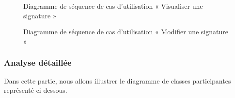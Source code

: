 \begin{figure}[H]
  \centering
  \caption{Diagramme de séquence de cas d'utilisation « Visualiser une signature  »}
  \label{fig:sequence_view_signature}
\end{figure}

\begin{figure}[H]
  \centering
  \caption{Diagramme de séquence de cas d'utilisation « Modifier une signature  »}
  \label{fig:sequence_update_signature}
\end{figure}

\subsubsection{Analyse détaillée}
Dans cette partie, nous allons illustrer le diagramme de classes participantes représenté ci-dessous.\\

